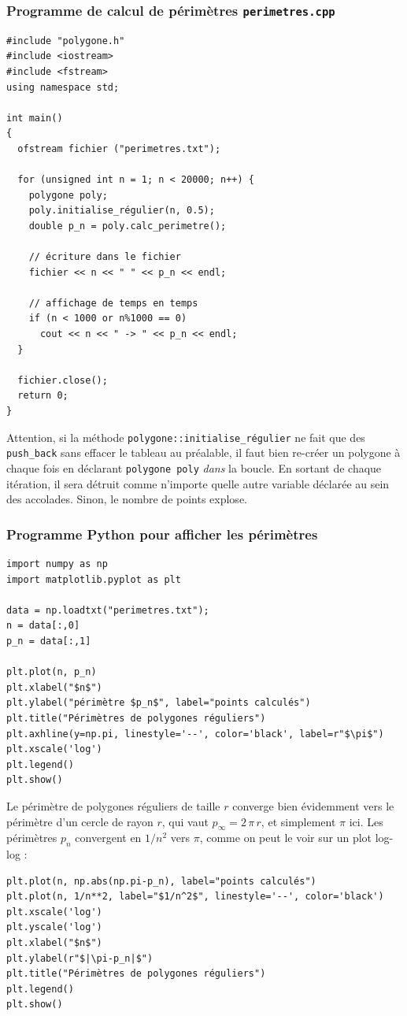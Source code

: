 \documentclass{book}
\newcommand{\inline}[1]{\texttt{#1}}
\begin{document}
\begin{correction}
\subsubsection*{Programme de calcul de périmètres \texttt{perimetres.cpp}}
\begin{verbatim}
#include "polygone.h"
#include <iostream>
#include <fstream>
using namespace std;

int main()
{
  ofstream fichier ("perimetres.txt");

  for (unsigned int n = 1; n < 20000; n++) {
    polygone poly;
    poly.initialise_régulier(n, 0.5);
    double p_n = poly.calc_perimetre();

    // écriture dans le fichier
    fichier << n << " " << p_n << endl;

    // affichage de temps en temps
    if (n < 1000 or n%1000 == 0)
      cout << n << " -> " << p_n << endl;
  }

  fichier.close();
  return 0;
}
\end{verbatim}

Attention, si la méthode \inline{polygone::initialise_régulier} ne fait que des \inline{push_back} sans effacer le tableau au préalable, il faut bien re-créer un polygone à chaque fois en déclarant \inline{polygone poly} {\em dans} la boucle. En sortant de chaque itération, il sera détruit comme n'importe quelle autre variable déclarée au sein des accolades. Sinon, le nombre de points explose.

\subsubsection*{Programme Python pour afficher les périmètres}

\begin{verbatim}
import numpy as np
import matplotlib.pyplot as plt

data = np.loadtxt("perimetres.txt");
n = data[:,0]
p_n = data[:,1]

plt.plot(n, p_n)
plt.xlabel("$n$")
plt.ylabel("périmètre $p_n$", label="points calculés")
plt.title("Périmètres de polygones réguliers")
plt.axhline(y=np.pi, linestyle='--', color='black', label=r"$\pi$")
plt.xscale('log')
plt.legend()
plt.show()
\end{verbatim}

Le périmètre de polygones réguliers de taille $r$ converge bien évidemment vers le périmètre d'un cercle de rayon $r$, qui vaut $p_\infty=2\,\pi\,r$, et simplement $\pi$ ici. Les périmètres $p_n$ convergent en $1/n^2$ vers $\pi$, comme on peut le voir sur un plot log-log :
\begin{verbatim}
plt.plot(n, np.abs(np.pi-p_n), label="points calculés")
plt.plot(n, 1/n**2, label="$1/n^2$", linestyle='--', color='black')
plt.xscale('log')
plt.yscale('log')
plt.xlabel("$n$")
plt.ylabel(r"$|\pi-p_n|$")
plt.title("Périmètres de polygones réguliers")
plt.legend()
plt.show()
\end{verbatim}


\end{correction}
\end{document}
